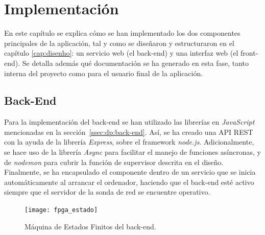 \chapter{Implementación\label{cap:implementacion}}

En este capítulo se explica cómo se han implementado los dos componentes principales de la aplicación, tal y como se diseñaron y estructuraron en el capítulo \ref{cap:disenho}: un servicio web (el \gls{back-end}) y una interfaz web (el \gls{front-end}).
Se detalla además qué documentación se ha generado en esta fase, tanto interna del proyecto como para el usuario final de la aplicación.

\section{Back-End\label{sec:imp:back_end}}

Para la implementación del \gls{back-end} se han utilizado las librerías en \textit{JavaScript} mencionadas en la sección~\ref{ssec:dp:back-end}.
Así, se ha creado una \gls{API} \gls{REST} con la ayuda de la librería \textit{Express}, sobre el \gls{framework} \textit{node.js}.
Adicionalmente, se hace uso de la librería \textit{Async} para facilitar el manejo de funciones asíncronas, y de \textit{nodemon} para cubrir la función de supervisor descrita en el diseño.
Finalmente, se ha encapsulado el componente dentro de un servicio que se inicia automáticamente al arrancar el ordenador, haciendo que el \gls{back-end} esté activo siempre que el servidor de la sonda de red se encuentre operativo.

\begin{figure}[!htp]
  \centering
  \texttt{[image: fpga\_estado]}
  \caption{Máquina de Estados Finitos del \gls{back-end}.}
  \label{fig:fpga_estado}
\end{figure}

